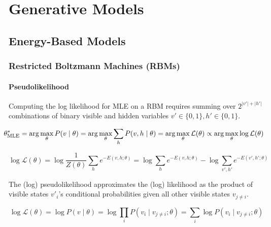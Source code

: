 \section{Generative Models}

\subsection{Energy-Based Models}

\subsubsection{Restricted Boltzmann Machines (RBMs)}

\paragraph{Pseudolikelihood}

Computing the log likelihood for MLE on a RBM requires summing over $2^{\lvert v' \rvert + \lvert h' \rvert}$
combinations of binary visible and hidden variables $v' \in \{0, 1\}, h' \in \{0, 1\}$.

\vspace{-10pt}

\begin{equation}
    \hspace{-7.5pt}
    \theta^*_\text{MLE}
    = \arg\max_\theta{P(v \mid \theta)}
    = \arg\max_\theta{\sum_h{P(v, h \mid \theta)}}
    = \arg\max_\theta{\mathcal{L}(\theta)}
    \propto \arg\max_\theta{\log{\mathcal{L}(\theta)}}
\end{equation}

\begin{equation}
    \log{\mathcal{L}(\theta)}
    = \log{\frac{1}{Z(\theta)}\sum_h{e^{-E(v, h; \theta)}}}
    = \log{\sum_h{e^{-E(v, h; \theta)}}} - \log{\sum_{v', h'}{e^{-E(v', h'; \theta)}}}
\end{equation}

The (log) pseudolikelihood \citep{Goodfellowetal2016} approximates the (log) likelihood as the
product of visible states $v'_i$'s conditional probabilities given all other visible states $v_{j \neq i}$.

\begin{equation}
    \log{\mathcal{L}(\theta)}
    = \log{P(v \mid \theta)}
    = \log{\prod_i{P(v_i \mid v_{j \neq i}; \theta)}}
    = \sum_i{\log{P(v_i \mid v_{j \neq i}; \theta)}}
\end{equation}

